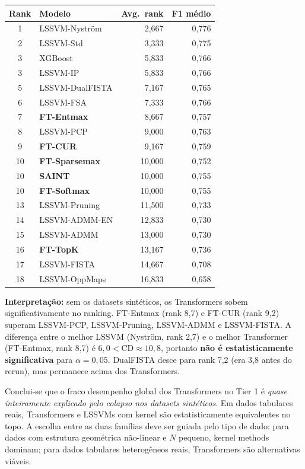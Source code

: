 \documentclass[12pt,a4paper]{article}
\begin{document}
\begin{center}
\small
\begin{tabular}{clrr}
\toprule
Rank & Modelo & Avg.\ rank & F1 médio \\
\midrule
1  & LSSVM-Nyström       & 2,667 & 0,776 \\
2  & LSSVM-Std           & 3,333 & 0,775 \\
3  & XGBoost             & 5,833 & 0,766 \\
3  & LSSVM-IP            & 5,833 & 0,766 \\
5  & LSSVM-DualFISTA     & 7,167 & 0,765 \\
6  & LSSVM-FSA           & 7,333 & 0,766 \\
\midrule
7  & \textbf{FT-Entmax}  & 8,667 & 0,757 \\
8  & LSSVM-PCP           & 9,000 & 0,763 \\
9  & \textbf{FT-CUR}     & 9,167 & 0,759 \\
10 & \textbf{FT-Sparsemax} & 10,000 & 0,752 \\
10 & \textbf{SAINT}      & 10,000 & 0,755 \\
10 & \textbf{FT-Softmax} & 10,000 & 0,755 \\
13 & LSSVM-Pruning       & 11,500 & 0,733 \\
14 & LSSVM-ADMM-EN       & 12,833 & 0,730 \\
15 & LSSVM-ADMM          & 13,000 & 0,730 \\
16 & \textbf{FT-TopK}    & 13,167 & 0,736 \\
17 & LSSVM-FISTA         & 14,667 & 0,708 \\
18 & LSSVM-OppMaps       & 16,833 & 0,658 \\
\bottomrule
\end{tabular}
\end{center}

\textbf{Interpretação:} sem os datasets sintéticos, os Transformers sobem
significativamente no ranking. FT-Entmax (rank 8,7) e FT-CUR (rank 9,2)
superam LSSVM-PCP, LSSVM-Pruning, LSSVM-ADMM e LSSVM-FISTA. A diferença
entre o melhor LSSVM (Nyström, rank 2,7) e o melhor Transformer (FT-Entmax,
rank 8,7) é $6{,}0 < \text{CD} \approx 10{,}8$, portanto
\textbf{não é estatisticamente significativa} para $\alpha = 0{,}05$.
DualFISTA desce para rank 7,2 (era 3,8 antes do rerun), mas permanece
acima dos Transformers.

Conclui-se que o fraco desempenho global dos Transformers no Tier 1 é
\emph{quase inteiramente explicado pelo colapso nos datasets sintéticos}.
Em dados tabulares reais, Transformers e LSSVMs com kernel são
estatisticamente equivalentes no topo. A escolha entre as duas famílias
deve ser guiada pelo tipo de dado: para dados com estrutura geométrica
não-linear e $N$ pequeno, kernel methods dominam; para dados tabulares
heterogêneos reais, Transformers são alternativas viáveis.
\end{document}
